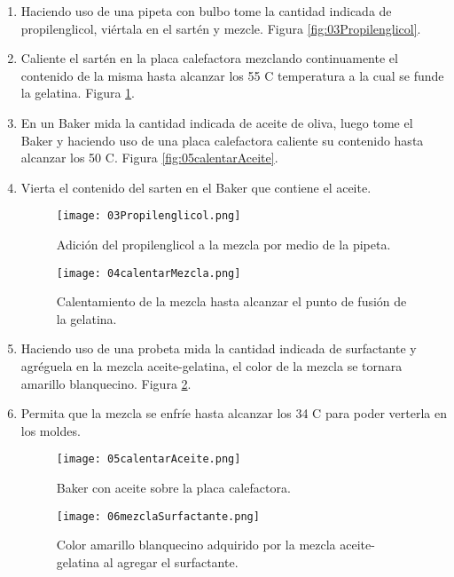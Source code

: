 \begin{enumerate}
\item Haciendo uso de una pipeta con bulbo tome la cantidad indicada de propilenglicol, viértala en el sartén y mezcle. Figura \ref{fig:03Propilenglicol}.

\item Caliente el sartén en la placa calefactora mezclando continuamente el contenido de la misma hasta alcanzar los 55 \degree C temperatura a la cual se funde la gelatina. Figura \ref{fig:04calentarMezcla}.

\item En un Baker mida la cantidad indicada de aceite de oliva, luego tome el Baker y haciendo uso de una placa calefactora caliente su contenido hasta alcanzar los 50 \degree C. Figura \ref{fig:05calentarAceite}.

\item Vierta el contenido del sarten en el Baker que contiene el aceite.

    \begin{figure}[H]
    \centering
    \begin{minipage}{0.45\textwidth}
        \centering
        \texttt{[image: 03Propilenglicol.png]}
        \caption{Adición del propilenglicol a la mezcla por medio de la pipeta.}
        \label{fig:03Propilenglicol}
    \end{minipage}\hfill
    \begin{minipage}{0.45\textwidth}
        \centering
        \texttt{[image: 04calentarMezcla.png]}
        \caption{Calentamiento de la mezcla hasta alcanzar el punto de fusión de la gelatina.}
        \label{fig:04calentarMezcla}
    \end{minipage}
    \end{figure}

\item Haciendo uso de una probeta mida la cantidad indicada de surfactante y agréguela en la mezcla aceite-gelatina, el color de la mezcla se tornara amarillo blanquecino. Figura \ref{fig:06mezclaSurfactante}. 

\item Permita que la mezcla se enfríe hasta alcanzar los 34 \degree C para poder verterla en los moldes.

    \begin{figure}[H]
    \centering
    \begin{minipage}{0.45\textwidth}
        \centering
        \texttt{[image: 05calentarAceite.png]}
        \caption{Baker con aceite sobre la placa calefactora.}
        \label{fig:05calentarAceite}
    \end{minipage}\hfill
    \begin{minipage}{0.45\textwidth}
        \centering
        \texttt{[image: 06mezclaSurfactante.png]}
        \caption{Color amarillo blanquecino adquirido por la mezcla aceite-gelatina al agregar el surfactante.}
        \label{fig:06mezclaSurfactante}
    \end{minipage}
    \end{figure}

\end{enumerate}

